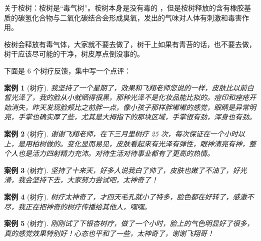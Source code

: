 \documentclass{ctexart}
\newtheorem{case}{案例}
\begin{document}
关于桉树：桉树是“毒气树”。桉树本身是没有毒的 ，但是桉树释放的含有橡胶基质的碳氢化合物与二氧化碳结合会形成臭氧，发出的气味对人体有刺激和毒害作用。

桉树会释放有毒气体，大家就不要去做了，树干上如果有青苔的话，也不要去做，树干应该尽可能的干净，树皮厚点倒没事的。

下面是 6 个树疗反馈，集中写一个点评：

\begin{case}[树疗]
    我坚持了一个星期了，效果和飞翔老师您说的一样，皮肤比以前白皙光泽了，我的脸从小就晒得很黑，那种光泽不是化妆品能比拟的。痘印和痤疮开始消失，昨天发现脸颊比之前胖一点，像小孩子那样胖嘟嘟的感觉，眼睛是异常明亮，手掌也确实厚了些，尤其是大拇指下的那块区域，手掌很有劲，浑身也有劲。
\end{case}

\begin{case}[树疗]
    谢谢飞翔老师，在下三月里树疗 25 次，每次保证在一个小时以上，是用柏树做的。变化显而易见，皮肤看起来有光泽有弹性，眼神清亮有神，整个人也是活力四射精力充沛。对待生活对待事业都有了更高的热情。
\end{case}

\begin{case}[树疗]
    坚持了十来天，好多人说我白了帅了，皮肤也嫩了不油了，好光滑，我会坚持下去，大家努力尝试吧，太神奇了！
\end{case}

\begin{case}[树疗]
    树疗太神奇了，才四天毛孔就小了特多，脸色都在好转了，感激不尽，我正在把神奇的树疗传播给其他人，嘿嘿。
\end{case}

\begin{case}[树疗]
    刚刚试了下银杏树疗，做了一个小时，脸上的气色明显好了很多，真的感觉效果特别好！心态也平和了一些，太神奇了，谢谢飞翔哥！
\end{case}
\end{document}
